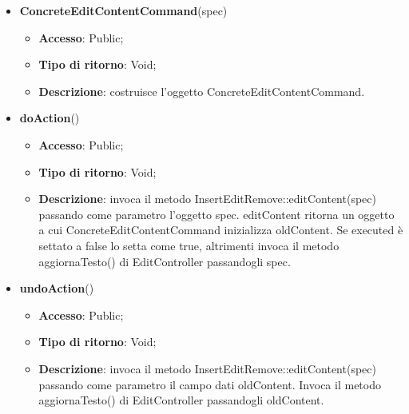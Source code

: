 {{{\begin{itemize}
\begin{itemize}
\begin{itemize}
\begin{itemize}
				\end{itemize}
			\end{itemize}
				\end{itemize}
				\end{itemize}
			\begin{itemize}
				\item \textbf{ConcreteEditContentCommand}(spec)
				\begin{itemize}
					\item \textbf{Accesso}: Public;
					\item \textbf{Tipo di ritorno}: Void;
					\item \textbf{Descrizione}: costruisce l’oggetto ConcreteEditContentCommand.
				\end{itemize}
				\item \textbf{doAction}()
				\begin{itemize}
					\item \textbf{Accesso}: Public;
					\item \textbf{Tipo di ritorno}: Void;
					\item \textbf{Descrizione}: invoca il metodo InsertEditRemove::editContent(spec) passando come parametro l'oggetto spec. editContent ritorna un oggetto a cui ConcreteEditContentCommand inizializza oldContent. Se executed è settato a false lo setta come true, altrimenti invoca il metodo aggiornaTesto() di EditController passandogli spec.
				\end{itemize}
				\item \textbf{undoAction}()
				\begin{itemize}
					\item \textbf{Accesso}: Public;
					\item \textbf{Tipo di ritorno}: Void;
					\item \textbf{Descrizione}: invoca il metodo InsertEditRemove::editContent(spec) passando come parametro il campo dati oldContent. Invoca il metodo aggiornaTesto() di EditController passandogli oldContent.
				\end{itemize}
			\end{itemize}
			}

}}
